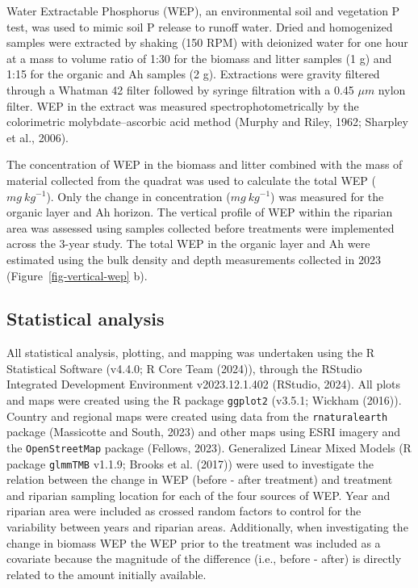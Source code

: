 \documentclass[
]{agujournal2019}
\begin{document}
Water Extractable Phosphorus (WEP), an environmental soil and vegetation
P test, was used to mimic soil P release to runoff water. Dried and
homogenized samples were extracted by shaking (150 RPM) with deionized
water for one hour at a mass to volume ratio of 1:30 for the biomass and
litter samples (1 g) and 1:15 for the organic and Ah samples (2 g).
Extractions were gravity filtered through a Whatman 42 filter followed
by syringe filtration with a 0.45 \(\mu m\) nylon filter. WEP in the
extract was measured spectrophotometrically by the colorimetric
molybdate--ascorbic acid method (Murphy and Riley, 1962; Sharpley et
al., 2006).

The concentration of WEP in the biomass and litter combined with the
mass of material collected from the quadrat was used to calculate the
total WEP (\(mg~kg^{-1}\)). Only the change in concentration
(\(mg~kg^{-1}\)) was measured for the organic layer and Ah horizon. The
vertical profile of WEP within the riparian area was assessed using
samples collected before treatments were implemented across the 3-year
study. The total WEP in the organic layer and Ah were estimated using
the bulk density and depth measurements collected in 2023
(Figure~\ref{fig-vertical-wep} b).

\subsection{Statistical analysis}\label{statistical-analysis}

All statistical analysis, plotting, and mapping was undertaken using the
R Statistical Software (v4.4.0; R Core Team (2024)), through the RStudio
Integrated Development Environment v2023.12.1.402 (RStudio, 2024). All
plots and maps were created using the R package \texttt{ggplot2}
(v3.5.1; Wickham (2016)). Country and regional maps were created using
data from the \texttt{rnaturalearth} package (Massicotte and South,
2023) and other maps using ESRI imagery and the \texttt{OpenStreetMap}
package (Fellows, 2023). Generalized Linear Mixed Models (R package
\texttt{glmmTMB} v1.1.9; Brooks et al. (2017)) were used to investigate
the relation between the change in WEP (before - after treatment) and
treatment and riparian sampling location for each of the four sources of
WEP. Year and riparian area were included as crossed random factors to
control for the variability between years and riparian areas.
Additionally, when investigating the change in biomass WEP the WEP prior
to the treatment was included as a covariate because the magnitude of
the difference (i.e., before - after) is directly related to the amount
initially available.
\end{document}
